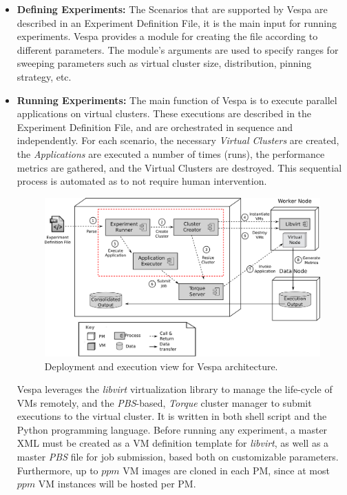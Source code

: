 \documentclass[11pt]{article}
\begin{document}
\begin{itemize}
  \item \textbf{Defining Experiments:} The Scenarios that are supported by Vespa are described in an Experiment Definition File, it is the main input for running experiments. Vespa provides a module for creating the file according to different parameters. The module's arguments are used to specify ranges for sweeping parameters such as virtual cluster size, distribution, pinning strategy, etc. 

  \item \textbf{Running Experiments:} The main function of Vespa is to execute parallel applications on virtual clusters. These executions are described in the Experiment Definition File, and are orchestrated in sequence and independently. For each scenario, the necessary \emph{Virtual Clusters} are created, the \emph{Applications} are executed a number of times (runs), the performance metrics are gathered, and the Virtual Clusters are destroyed. This sequential process is automated as to not require human intervention.

\begin{figure}
\centering
\includegraphics[scale=0.38]{figures/execution.png}
\caption{Deployment and execution view for Vespa architecture.}
\label{fig:Vespa}
\end{figure}

Vespa leverages the \emph{libvirt} virtualization library to manage the life-cycle of VMs remotely, and the \emph{PBS}-based, \emph{Torque} cluster manager to submit executions to the virtual cluster. It is written in both shell script and the Python programming language. Before running any experiment, a master XML must be created as a VM definition template for \emph{libvirt}, as well as a master \emph{PBS} file for job submission, based both on customizable parameters. Furthermore, up to $ppm$ VM images are cloned in each PM, since at most $ppm$ VM instances will be hosted per PM. %


\end{itemize}
\end{document}
